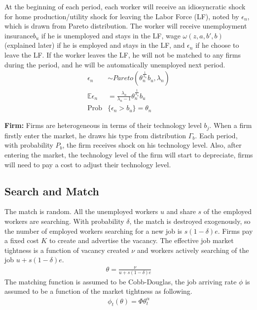 \documentclass{article}
\newcommand{\E}{\mathbb{E}}
\newcommand{\1}{\mathbb{1}}
\DeclareMathOperator{\Prob}{Prob}
\begin{document}
At the beginning of each period, each worker will receive an idiosyncratic shock for home production/utility shock for leaving the Labor Force (LF), noted by $\epsilon_n$, which is drawn from Pareto distribution. The worker will receive unemployment insurance$b_u$ if he is unemployed and stays in the LF, wage $\omega(z,a,b',b)$ (explained later) if he is employed and stays in the LF, and $\epsilon_n$ if he choose to leave the LF. If the worker leaves the LF, he will not be matched to any firms during the period, and he will be automatically unemployed next period. \\
\begin{align*}
\epsilon_n &\sim Pareto(\theta_n^{\frac{1}{\lambda_n}}b_u,\lambda_n) \\
\E \epsilon_n &= \frac{\lambda_n}{\lambda_n-1}\theta_n^{\frac{1}{\lambda_n}}b_u \\
\Prob &\{\epsilon_n > b_u\} = \theta_n
\end{align*}

\textbf{Firm: }
Firms are heterogeneous in terms of their technology level $b_j$. When a firm firstly enter the market, he draws his type from distribution $\Gamma_b$.  
Each period, with probability $P_b$, the firm receives shock on his technology level. 
Also, after entering the market, the technology level of the firm will start to depreciate, firms will need to pay a cost to adjust their technology level. 

\subsection{Search and Match}
The match is random. All the unemployed workers $u$ and share $s$ of the employed workers are searching. With probability $\delta$, the match is destroyed exogenously, so the number of employed workers searching for a new job is $s(1-\delta)e$. Firms pay a fixed cost $K$ to create and advertise the vacancy. The effective job market tightness is a function of vacancy created $\nu$ and workers actively searching of the job $u+s(1-\delta)e$. 
\begin{align*}
\theta = \frac{\nu}{u+s(1-\delta)e}
\end{align*}
The matching function is assumed to be Cobb-Douglas, the job arriving rate $\phi$ is assumed to be a function of the market tightness as following. 
\begin{align*}
\phi_t(\theta) = \Phi \theta_t^\alpha
\end{align*}
\end{document}
